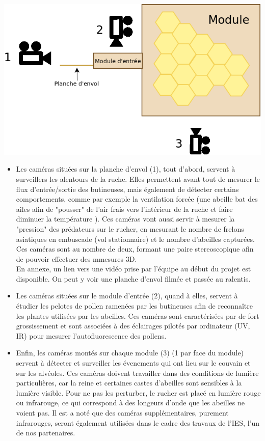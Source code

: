 \documentclass[11pt,french,a4paper]{report}
\begin{document}
\begin{center}
\includegraphics[scale=0.3]{../images/dia/schema_camera.png}
\end{center}
\begin{itemize}

  \item Les caméras situées sur la planche d'envol (1), tout d'abord, servent à surveillers 
  les alentours de la ruche. Elles permettent avant tout de
  mesurer le flux d'entrée/sortie des butineuses, mais également de détecter
  certains comportements, comme par exemple la ventilation forcée (une abeille
  bat des ailes afin de "pousser" de l'air frais vers l'intérieur de la ruche et faire
  diminuer la température ). Ces caméras vont aussi servir à mesurer la
  "pression" des prédateurs sur le rucher, en mesurant le nombre de frelons
  asiatiques en embuscade (vol stationnaire) et le nombre d'abeilles
  capturées. Ces caméras sont au nombre de deux, formant une paire
  stereoscopique afin de pouvoir effectuer des mmesures 3D. \\
  En annexe, un lien vers une vidéo prise par l'équipe au début du projet est disponible. 
  On peut y voir une planche d'envol filmée et passée au ralentis. \\ 
 
  \item Les caméras situées sur le module d'entrée (2), quand à elles, servent à étudier
  les pelotes de pollen ramenées par les butineuses afin de reconnaître les
  plantes utilisées par les abeilles. Ces caméras sont caractérisées par de
  fort grossissement et sont associées à des éclairages pilotés par ordinateur
  (UV, IR) pour mesurer l'autofluorescence des pollens.

  \item Enfin, les caméras montés sur chaque module (3) (1 par face du module) servent
  à détecter et surveiller les évenements qui ont lieu sur le couvain et sur
  les alvéoles. Ces caméras doivent travailler dans des conditions de lumière
  particulières, car la reine et certaines castes d'abeilles sont sensibles à
  la lumière visible. Pour ne pas les perturber, le rucher est placé en
  lumière rouge ou infrarouge, ce qui correspond à des longeurs d'onde que les
  abeilles ne voient pas. Il est a noté que des caméras supplémentaires,
  purement infrarouges, seront également utilisées dans le cadre des travaux de
  l'IES, l'un de nos partenaires.
\end{itemize}
\end{document}
